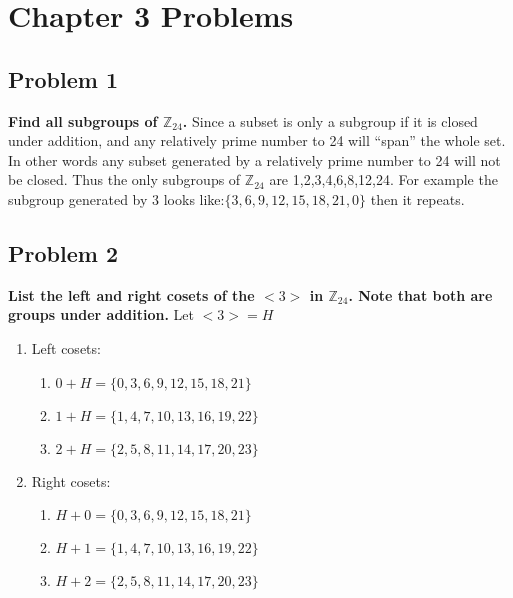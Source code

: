 \documentclass[12pt]{article}
\title{\scalebox{2}{Math 431 Homework 1}}
\author{\scalebox{1.5}{Theo Koss}}
\date{September 2020}
\newcommand{\Z}{\mathbb{Z}}
\begin{document}
\maketitle
\section{Chapter 3 Problems}
\subsection{Problem 1}
\textbf{Find all subgroups of $\Z_{24}$.}
\newline Since a subset is only a subgroup if it is closed under addition, and any relatively prime number to 24 will ``span'' the whole set. In other words any subset generated by a relatively prime number to 24 will not be closed. Thus the only subgroups of $\Z_{24}$ are 1,2,3,4,6,8,12,24. For example the subgroup generated by 3 looks like:$\{3,6,9,12,15,18,21,0\}$ then it repeats.
\subsection{Problem 2}
\textbf{List the left and right cosets of the $<3>$ in $\Z_{24}$. Note that both are groups under addition.}
\newline Let $<3>=H$\begin{enumerate}
    \item Left cosets: \begin{enumerate}
        \item $0+H=\{0,3,6,9,12,15,18,21\}$
        \item $1+H=\{1,4,7,10,13,16,19,22\}$
        \item $2+H=\{2,5,8,11,14,17,20,23\}$
    \end{enumerate}
    \item Right cosets: \begin{enumerate}
        \item $H+0=\{0,3,6,9,12,15,18,21\}$
        \item $H+1=\{1,4,7,10,13,16,19,22\}$
        \item $H+2=\{2,5,8,11,14,17,20,23\}$
    \end{enumerate}
\end{enumerate}
\end{document}
